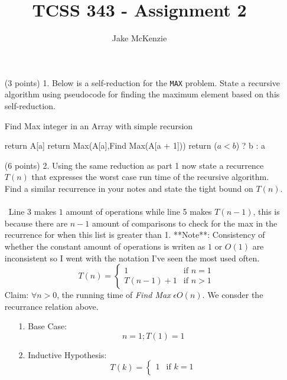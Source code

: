 \documentclass[paper=a4,fontsize=11pt]{article}
\begin{document}
\title{TCSS 343 - Assignment 2}
\author{Jake McKenzie}
\maketitle
\begin{enumerate}
\item [(3 points) 1.] Below is a self-reduction for the \texttt{MAX} problem. State a recursive algorithm using pseudocode for finding the maximum element based on this self-reduction.\\
\begin{algorithm}
\caption{Find Max integer in an Array with simple recursion}
\label{array-max}
\begin{algorithmic}[1]
        \State return A[a]
        \State return Max(A[a],Find Max(A[a + 1]))
    \EndIf
\EndProcedure
{}
    return ($a < b$) ? b : a
\EndProcedure
\end{algorithmic}
\end{algorithm}
\item [(6 points) 2.] Using the same reduction as part 1 now state a recurrence $T(n)$ that expresses the worst case run time of the recursive algorithm. Find a similar recurrence in your notes and state the tight bound on $T(n)$.\\\\\
Line 3 makes $1$ amount of operations while line 5 makes $T(n-1)$, this is because there are $n-1$ amount of comparisons to check for the max in the recurrence for when this list is greater than 1. **Note**: Consistency of whether the constant amount of operations is writen as $1$ or $O(1)$ are inconsistent so I went with the notation I've seen the most used often.
\[
  T(n) =
    \begin{cases}
        1 & \text{if $n = 1$} \\
        T(n-1) + 1 & \text{if $n > 1$}
    \end{cases}
\]
Claim: $\forall n > 0$, the running time of \textit{Find Max} $\epsilon O(n)$. We consder the recurrance relation above.
\begin{enumerate}
\item[1.] Base Case:\\
$$n = 1; T(1) = 1$$
\item[2.] Inductive Hypothesis:\\
\[
  T(k) =
    \begin{cases}
        1 & \text{if $k = 1$} \\

\end{cases}\]
\end{enumerate}
\end{enumerate}
\end{document}
